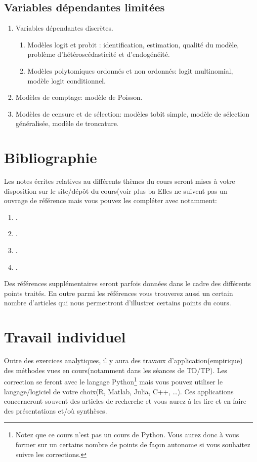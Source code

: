\documentclass[10pt, reqno]{amsart}
\begin{document}
\subsection{Variables dépendantes limitées}
\begin{enumerate}
\item Variables dépendantes discrètes.
\begin{enumerate}
\item Modèles logit et probit : identification, estimation, qualité du modèle, problème d'hétéroscédasticité et d'endogénéité.
\item Modèles polytomiques ordonnés et non ordonnés: logit multinomial, modèle logit conditionnel.
\end{enumerate}
\item Modèles de comptage: modèle de Poisson.
\item Modèles de censure et de sélection: modèles tobit simple, modèle de sélection généralisée, 
modèle de troncature.
\end{enumerate}


\section{Bibliographie}

Les notes écrites relatives au différents thèmes du cours seront mises à votre disposition sur le site/dépôt du cours(voir plus ba
Elles ne suivent pas un ouvrage de référence mais vous pouvez les compléter avec  notamment:
\begin{enumerate}
\item \cite{Amemiya1985}.
\item \cite{ap2009}.
\item \cite{Hansen2017}.
\item \cite{Wooldridge2010}.
\end{enumerate}
Des références supplémentaires seront parfois données dans le cadre des différents points traités.
En outre parmi les références vous trouverez aussi un certain nombre d'articles qui nous 
permettront d'illustrer certains points du cours. 


\section{Travail individuel}
Outre des exercices analytiques, il y aura des travaux d'application(empirique) des méthodes 
vues en cours(notamment dans les séances de TD/TP). Les correction se feront avec le langage 
Python\footnote{Notez que ce cours n'est pas un cours de Python. Vous aurez donc à vous former sur un certains nombre de points 
de façon autonome si vous souhaitez suivre les corrections.} mais vous pouvez utiliser 
le langage/logiciel de votre choix(R, Matlab, Julia, C++, \ldots). Ces applications concerneront souvent 
des articles de recherche et vous aurez à les lire et en faire des présentations et/où synthèses.
\end{document}
